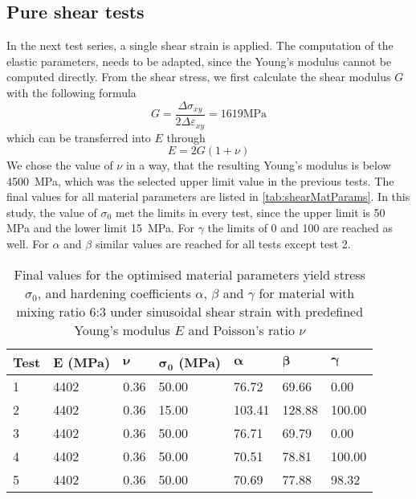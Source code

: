 \subsection{Pure shear tests}
In the next test series, a single shear strain is applied. The computation of the elastic parameters, needs to be adapted, since the Young's modulus cannot be computed directly. From the shear stress, we first calculate the shear modulus $G$ with the following formula
\begin{equation}
    G = \frac{\Delta\sigma_{xy}}{2\Delta\varepsilon_{xy}} = 1619 \text{MPa}
\end{equation}
which can be transferred into $E$ through
\begin{equation}
    E = 2G(1+\nu) 
\end{equation}
We chose the value of $\nu$ in a way, that the resulting Young's modulus is below 4500 MPa, which was the selected upper limit value in the previous tests. The final values for all material parameters are listed in \autoref{tab:shearMatParams}. In this study, the value of $\sigma_0$ met the limits in every test, since the upper limit is 50 MPa and the lower limit 15 MPa. For $\gamma$ the limits of 0 and 100 are reached as well. For $\alpha$ and $\beta$ similar values are reached for all tests except test 2. 

\begin{table}[h!]
\centering
\caption{Final values for the optimised material parameters yield stress $\sigma_0$, and hardening coefficients $\alpha$, $\beta$ and $\gamma$ for material with mixing ratio 6:3 under sinusoidal shear strain with predefined Young's modulus $E$ and Poisson's ratio $\nu$}
\label{tab:shearMatParams}
\renewcommand{\arraystretch}{1.1}
\begin{tabular}{L{0.08\textwidth}|C{0.08\textwidth}C{0.08\textwidth}C{0.08\textwidth}C{0.08\textwidth}C{0.08\textwidth}C{0.08\textwidth}}
\toprule
\textbf{Test} & \textbf{E (MPa)} & $\boldsymbol{\nu}$ & $\boldsymbol{\sigma_0}$ \textbf{(MPa)} & $\boldsymbol{\alpha}$ & $\boldsymbol{\beta}$ & $\boldsymbol{\gamma}$ \\
 & 4402 & 0.36 & 50.00 & 76.72 & 69.66 & 0.00 \\
2 & 4402 & 0.36 & 15.00 & 103.41 & 128.88 & 100.00 \\
3 & 4402 & 0.36 & 50.00 & 76.71 & 69.79 & 0.00 \\
4 & 4402 & 0.36 & 50.00 & 70.51 & 78.81 & 100.00  \\
5 & 4402 & 0.36 & 50.00 & 70.69 & 77.88 & 98.32 \\
\bottomrule
\end{tabular}
\end{table}

